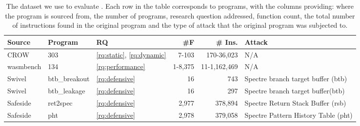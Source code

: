 
\begin{table}
\renewcommand\arraystretch{1.1}
\begin{adjustbox}{width=\linewidth,totalheight=\textheight, keepaspectratio}
{
\color{blue}
    \begin{tabular}{p{1.5cm} | l | l | r | r | p{2cm}  }
        \hline
        Source & Program & RQ & \#F & \# Ins. & Attack  \\
        \hline \hline
        CROW \cite{arteaga2020crow} & 303 & \ref{rq:static}, \ref{rq:dynamic} & 7-103 & 170-36,023 & N/A  \\
        \hline

        wasmbench \cite{hilbig2021empirical} & 134 & \ref{rq:performance} & 1-8,375 & 11-1,162,469 & N/A \\
        
        \hline

        Swivel \cite{Swivel} & btb\_breakout & \ref{rq:defensive} & 16 & 743 & Spectre branch target buffer (btb)  \\
        \hline
        Swivel \cite{Swivel}  & btb\_leakage & \ref{rq:defensive} & 16 & 297 & Spectre branch target buffer(btb)  \\
        \hline
        Safeside \cite{Swivel, safeside}  & ret2spec & \ref{rq:defensive} & 2,977 & 378,894 & Spectre Return Stack Buffer (rsb)  \\
        \hline
        Safeside  \cite{Swivel, safeside} & pht & \ref{rq:defensive} & 2,978 & 379,058 & Spectre Pattern History Table (pht)  \\

        

    \end{tabular}
}
\end{adjustbox}
    
    \caption{The dataset we use to evaluate \tool. Each row in the table corresponds to programs, with the columns providing: where the program is sourced from, the number of programs, research question addressed, function count, the total number of instructions found in the original \wasm program and the type of attack that the original program was subjected to.}
    \label{tab:corpus}
\end{table}
